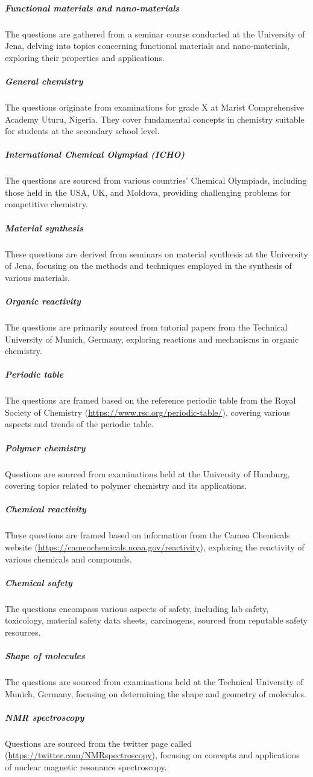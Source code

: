\documentclass[11pt, oneside]{article}
\begin{document}
\subparagraph{Functional materials and nano-materials}
The questions are gathered from a seminar course conducted at the University of Jena, delving into topics concerning functional materials and nano-materials, exploring their properties and applications.

\subparagraph{General chemistry}
The questions originate from examinations for grade X at Marist Comprehensive Academy Uturu, Nigeria. They cover fundamental concepts in chemistry suitable for students at the secondary school level.

\subparagraph{International Chemical Olympiad (\gls{ICHO})}
The questions are sourced from various countries' Chemical Olympiads, including those held in the USA, UK, and Moldova, providing challenging problems for competitive chemistry.

\subparagraph{Material synthesis}
These questions are derived from seminars on material synthesis at the University of Jena, focusing on the methods and techniques employed in the synthesis of various materials.

\subparagraph{Organic reactivity}
The questions are primarily sourced from tutorial papers from the Technical University of Munich, Germany, exploring reactions and mechanisms in organic chemistry.

\subparagraph{Periodic table}
The questions are framed based on the reference periodic table from the Royal Society of Chemistry (\url{https://www.rsc.org/periodic-table/}), covering various aspects and trends of the periodic table.

\subparagraph{Polymer chemistry}
Questions are sourced from examinations held at the University of Hamburg, covering topics related to polymer chemistry and its applications.

\subparagraph{Chemical reactivity}
These questions are framed based on information from the Cameo Chemicals website (\url{https://cameochemicals.noaa.gov/reactivity}), exploring the reactivity of various chemicals and compounds.

\subparagraph{Chemical safety}
The questions encompass various aspects of safety, including lab safety, toxicology, material safety data sheets, carcinogens, sourced from reputable safety resources.

\subparagraph{Shape of molecules}
The questions are sourced from examinations held at the Technical University of Munich, Germany, focusing on determining the shape and geometry of molecules.

\subparagraph{\gls{NMR} spectroscopy}
Questions are sourced from the twitter page called (\url{https://twitter.com/NMRspectroscopy}), focusing on concepts and applications of nuclear magnetic resonance spectroscopy.
\end{document}
